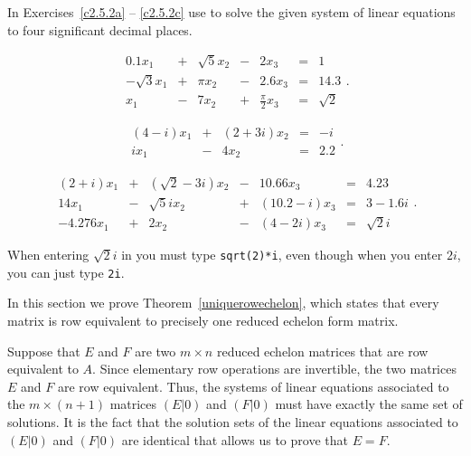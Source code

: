 \CEXER

\noindent In Exercises~\ref{c2.5.2a} -- \ref{c2.5.2c} use \Matlab to
solve the given system of linear equations to four significant decimal places.
\begin{exercise} \label{c2.5.2a}
\[
\begin{array}{rcrcrcr}
     0.1 x_1 & + & \sqrt{5}x_2 & - &   2 x_3 & = & 1 \\
-\sqrt{3}x_1 & + &     \pi x_2 & - & 2.6 x_3 & = & 14.3 \\
         x_1 & - &       7 x_2 & + & \frac{\pi}{2}x_3 & = & \sqrt{2}
\end{array}.
\]
\end{exercise}
\begin{exercise} \label{c2.5.2b}
\[
\begin{array}{rcrcr}
(4-i)x_1 & + & (2+3i)x_2 & = &  -i \\
   i x_1 & - &     4 x_2 & = & 2.2
\end{array}.
\]
\end{exercise}
\begin{exercise} \label{c2.5.2c}
\[
\begin{array}{rcrcrcr}
 (2+i) x_1 & + & (\sqrt{2}-3i)x_2 & - &    10.66 x_3 & = &     4.23 \\
    14 x_1 & - &    \sqrt{5}i x_2 & + & (10.2-i) x_3 & = &    3-1.6i \\
-4.276 x_1 & + &            2 x_2 & - &   (4-2i) x_3 & = & \sqrt{2}i
\end{array}.
\]

  When entering $\sqrt{2}i$ in \Matlab you must type
{\tt sqrt(2)*i}, even though when you enter $2i$, you can just type
{\tt 2i}.
\end{exercise}


\label{S:uniquerowechelon}


In this section we prove Theorem~\ref{uniquerowechelon}, which
states that every matrix is row equivalent to precisely one
reduced echelon form matrix.  

Suppose that $E$ and $F$ are two $m\times n$ reduced echelon
matrices that are row equivalent to $A$.  Since elementary row
operations are invertible, the two matrices $E$ and $F$ are
row equivalent.  Thus, the systems of linear equations associated to 
the $m\times (n+1)$ matrices $(E|0)$ and $(F|0)$ must have exactly the
same set of solutions.  It is the fact that the solution sets
of the linear equations associated to $(E|0)$ and $(F|0)$ are
identical that allows us to prove that $E=F$.

